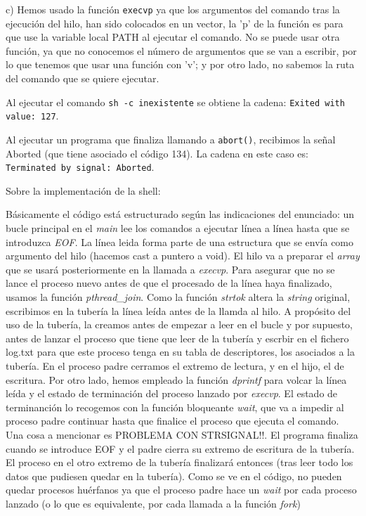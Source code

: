 \documentclass{article}
\begin{document}
c) Hemos usado la función \texttt{execvp} ya que los argumentos del comando tras la ejecución del hilo, han sido colocados en un vector, la 'p' de la función es para que use la variable local PATH al ejecutar el comando. No se puede usar otra función, ya que no conocemos el número de argumentos que se van a escribir, por lo que tenemos que usar una función con 'v'; y por otro lado, no sabemos la ruta del comando que se quiere ejecutar.

Al ejecutar el comando \texttt{sh -c inexistente} se obtiene la cadena: \texttt{Exited with value: 127}.

Al ejecutar un programa que finaliza llamando a \texttt{abort()}, recibimos la señal Aborted (que tiene asociado el código 134). La cadena en este caso es: \texttt{Terminated by signal: Aborted}.






Sobre la implementación de la shell: 

Básicamente el código está estructurado según las indicaciones del enunciado:  un bucle principal en el \textit{main} lee los comandos a ejecutar línea a línea hasta que se introduzca \textit{EOF}. La línea leida forma parte de una estructura que se envía como argumento del hilo (hacemos cast a puntero a void). El hilo va a preparar el \textit{array} que se usará posteriormente en la llamada a \textit{execvp}. Para asegurar que no se lance el proceso nuevo antes de que el procesado de la línea haya finalizado, usamos la función \textit{pthread\_join}.
Como la función \textit{strtok} altera la \textit{string} original, escribimos en la tubería la línea leída antes de la llamda al hilo. A propósito del uso de la tubería, la creamos antes de empezar a leer en el bucle y por supuesto, antes de lanzar el proceso que tiene que leer de la tubería y escrbir en el fichero log.txt para que este proceso tenga en su tabla de descriptores, los asociados a la tubería. En el proceso padre cerramos el extremo de lectura, y en el hijo, el de escritura.
Por otro lado, hemos empleado la función \textit{dprintf} para volcar la línea leída y el estado de terminación del proceso lanzado por \textit{execvp}. El estado de terminanción lo recogemos con la función bloqueante \textit{wait}, que va a impedir al proceso padre continuar hasta que finalice el proceso que ejecuta el comando. Una cosa a mencionar es PROBLEMA CON STRSIGNAL!!. El programa finaliza cuando se introduce EOF y el padre cierra su extremo de escritura de la tubería. El proceso en el otro extremo de la tubería finalizará entonces (tras leer todo los datos que pudiesen quedar en la tubería). Como se ve en el código, no pueden quedar procesos huérfanos ya que el proceso padre hace un \textit{wait} por cada proceso lanzado (o lo que es equivalente, por cada llamada a la función \textit{fork})
\end{document}
